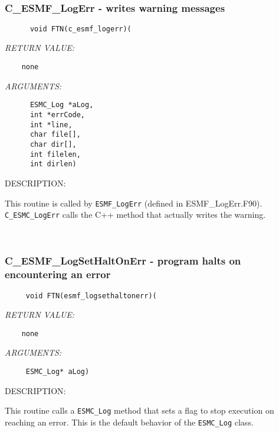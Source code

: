  
\mbox{}\hrulefill\ 
 
\subsubsection [C\_ESMF\_LogErr] {C\_ESMF\_LogErr - writes warning messages}


  
\begin{verbatim}      void FTN(c_esmf_logerr)(\end{verbatim}{\em RETURN VALUE:}
\begin{verbatim}    none\end{verbatim}{\em ARGUMENTS:}
\begin{verbatim}      ESMC_Log *aLog,
      int *errCode,
      int *line, 
      char file[],
      char dir[],
      int filelen,
      int dirlen)\end{verbatim}
{\sf DESCRIPTION:\\ }


      This routine is called by {\tt ESMF\_LogErr} (defined in ESMF\_LogErr.F90). 
      {\tt C\_ESMC\_LogErr} calls the C++ method that actually writes the warning.
   
 
\mbox{}\hrulefill\ 
 

  \subsubsection [C\_ESMF\_LogSetHaltOnErr] {C\_ESMF\_LogSetHaltOnErr - program halts on encountering an error}


  
\begin{verbatim}     void FTN(esmf_logsethaltonerr)(\end{verbatim}{\em RETURN VALUE:}
\begin{verbatim}    none\end{verbatim}{\em ARGUMENTS:}
\begin{verbatim}     ESMC_Log* aLog)\end{verbatim}
{\sf DESCRIPTION:\\ }


      This routine calls a {\tt ESMC\_Log} method that sets
      a flag to stop execution on
      reaching an error. This is the default behavior of the {\tt ESMC\_Log} class. 
 
